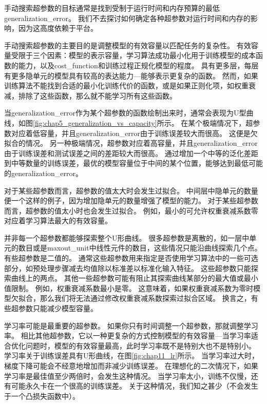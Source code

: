 手动搜索超参数的目标通常是找到受制于运行时间和内存预算的最低\gls{generalization_error}。
我们不去探讨如何确定各种超参数对运行时间和内存的影响，因为这高度依赖于平台。

手动搜索超参数的主要目的是调整模型的有效容量以匹配任务的复杂性。
有效容量受限于三个因素：模型的表示容量，学习算法成功最小化用于训练模型的成本函数的能力，以及\gls{cost_function}和训练过程正规化模型的程度。
具有更多层，每层有更多隐单元的模型具有较高的表达能力---能够表示更复杂的函数。
然而，如果训练算法不能找到合适的最小化训练代价的函数，或是如果正则化项，如权重衰减，排除了这些函数，那么就不能学习所有这些函数。

当\gls{generalization_error}作为某个超参数的函数绘制出来时，通常会表现为U型曲线，如图\ref{fig:chap5_generalization_vs_capacity}所示。
在某个极端情况下，超参数对应着低容量，并且\gls{generalization_error}由于训练误差较大而很高。
这便是欠拟合的情况。
另一种极端情况，超参数对应着高容量，并且\gls{generalization_error}由于训练误差和测试误差之间的差距较大而很高。
通过增加一个中等的泛化差距到中等数量的训练误差，最优的模型容量位于中间的某个位置，能够达到最低可能的\gls{generalization_error}。


对于某些超参数而言，超参数的值太大时会发生过拟合。
中间层中隐单元的数量便一个这样的例子，因为增加隐单元的数量增强了模型的能力。
对于某些超参数而言，超参数的值太小时也会发生过拟合。
例如，最小的可允许权重衰减系数零对应着学习算法最大的有效容量。

并非每一个超参数都能够探索整个U形曲线。
很多超参数是离散的，如一层中单元的数目或是\gls{maxout_unit}中线性元件的数目，这些情况只能沿曲线探索几个点。
有些超参数是二值的。
通常这些超参数用来指定是否使用学习算法中的一些可选部分，如预处理步骤减去均值除以标准差以标准化输入特征。
这些超参数只能探索曲线上的两点。
其他一些超参数可能有阻止其探索曲线某部分的最大值或最小值限制。
例如，权重衰减系数最小是零。
这意味着，如果权重衰减系数为零时模型欠拟合，那么我们将无法通过修改权重衰减系数探索过拟合区域。
换言之，有些超参数只能减少模型容量。

学习率可能是最重要的超参数。
如果你只有时间调整一个超参数，那就调整学习率。
相比其他超参数，它以一种更复杂的方式控制模型的有效容量---当学习率适合优化问题时，模型的有效容量最高，此时学习率既不是特别大也不是特别小。
学习率关于训练误差具有U形曲线，在图\ref{fig:chap11_lr}所示。
当学习率过大时，梯度下降可能会不经意地增加而非减少训练误差。
在理想化的二次情况下，如果学习率是最佳值至少两倍时，会发生这种情况\citep{LeCun+98backprop-small}。
当学习率太小，训练不仅慢，还有可能永久卡在一个很高的训练误差。
关于这种情况，我们知之甚少（不会发生于一个凸损失函数中）。

